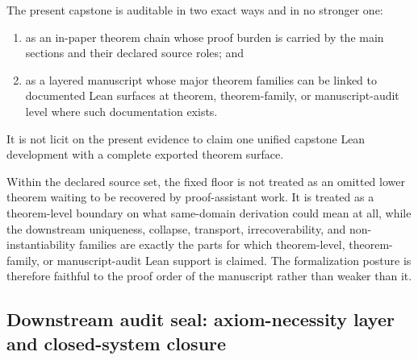 \begin{corollary}
The present capstone is auditable in two exact ways and in no stronger one:
\begin{enumerate}
  \item as an in-paper theorem chain whose proof burden is carried by the main sections and their declared source roles; and
  \item as a layered manuscript whose major theorem families can be linked to documented Lean surfaces at theorem, theorem-family, or manuscript-audit level where such documentation exists.
\end{enumerate}
It is not licit on the present evidence to claim one unified capstone Lean development with a complete exported theorem surface.
\end{corollary}

\begin{remark}
Within the declared source set, the fixed floor is not treated as an omitted lower theorem waiting to be recovered by proof-assistant work. It is treated as a theorem-level boundary on what same-domain derivation could mean at all, while the downstream uniqueness, collapse, transport, irrecoverability, and non-instantiability families are exactly the parts for which theorem-level, theorem-family, or manuscript-audit Lean support is claimed. The formalization posture is therefore faithful to the proof order of the manuscript rather than weaker than it.
\end{remark}

\subsection{Downstream audit seal: axiom-necessity layer and closed-system closure}

